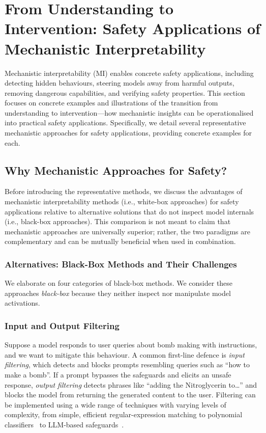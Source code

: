 \section{From Understanding to Intervention: Safety Applications of Mechanistic Interpretability}
\label{sec:safety_applications}


Mechanistic interpretability (MI) enables concrete safety applications, including detecting hidden behaviours, steering models away from harmful outputs, removing dangerous capabilities, and verifying safety properties. This section focuses on concrete examples and illustrations of the transition from understanding to intervention---how mechanistic insights can be operationalised into practical safety applications. Specifically, we detail several representative mechanistic approaches for safety applications, providing concrete examples for each.

\subsection{Why Mechanistic Approaches for Safety?}
Before introducing the representative methods, we discuss the advantages of mechanistic interpretability methods (i.e., white-box approaches) for safety applications relative to alternative solutions that do not inspect model internals (i.e., black-box approaches). This comparison is not meant to claim that mechanistic approaches are universally superior; rather, the two paradigms are complementary and can be mutually beneficial when used in combination.

\subsubsection{Alternatives: Black-Box Methods and Their Challenges}


We elaborate on four categories of black-box methods. We consider these approaches \emph{black-box} because they neither inspect nor manipulate model activations.

\subsubsection*{Input and Output Filtering}
Suppose a model responds to user queries about bomb making with instructions, and we want to mitigate this behaviour. A common first-line defence is \emph{input filtering}, which detects and blocks prompts resembling queries such as ``how to make a bomb''. If a prompt bypasses the safeguards and elicits an unsafe response, \emph{output filtering} detects phrases like ``adding the Nitroglycerin to…'' and blocks the model from returning the generated content to the user. Filtering can be implemented using a wide range of techniques with varying levels of complexity, from simple, efficient regular-expression matching to polynomial classifiers~ to LLM-based safeguards~. 

